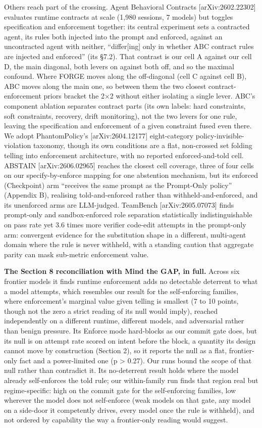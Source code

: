 \documentclass[11pt]{article}
\begin{document}
Others reach part of the crossing. Agent Behavioral Contracts {[}arXiv:2602.22302{]} evaluates runtime contracts at scale (1,980 sessions, 7 models) but toggles specification and enforcement together: its central experiment sets a contracted agent, its rules both injected into the prompt and enforced, against an uncontracted agent with neither, ``differ{[}ing{]} only in whether ABC contract rules are injected and enforced'' (its \S7.2). That contrast is our cell A against our cell D, the main diagonal, both levers on against both off, and so the maximal confound. Where FORGE moves along the off-diagonal (cell C against cell B), ABC moves along the main one, so between them the two closest contract-enforcement priors bracket the 2$\times$2 without either isolating a single lever. ABC's component ablation separates contract parts (its own labels: hard constraints, soft constraints, recovery, drift monitoring), not the two levers for one rule, leaving the specification and enforcement of a given constraint fused even there. We adopt PhantomPolicy's {[}arXiv:2604.12177{]} eight-category policy-invisible-violation taxonomy, though its own conditions are a flat, non-crossed set folding telling into enforcement architecture, with no reported enforced-and-told cell. ABSTAIN {[}arXiv:2606.02965{]} reaches the closest cell coverage, three of four cells on our specify-by-enforce mapping for one abstention mechanism, but its enforced (Checkpoint) arm ``receives the same prompt as the Prompt-Only policy'' (Appendix B), realising told-and-enforced rather than withheld-and-enforced, and its unenforced arms are LLM-judged. TeamBench {[}arXiv:2605.07073{]} finds prompt-only and sandbox-enforced role separation statistically indistinguishable on pass rate yet 3.6 times more verifier code-edit attempts in the prompt-only arm: convergent evidence for the substitution shape in a different, multi-agent domain where the rule is never withheld, with a standing caution that aggregate parity can mask sub-metric enforcement value.

\textbf{The Section 8 reconciliation with Mind the GAP, in full.} Across six frontier models it finds runtime enforcement adds no detectable deterrent to what a model attempts, which resembles our result for the self-enforcing families, where enforcement's marginal value given telling is smallest (7 to 10 points, though not the zero a strict reading of its null would imply), reached independently on a different runtime, different models, and adversarial rather than benign pressure. Its Enforce mode hard-blocks as our commit gate does, but its null is on attempt rate scored on intent before the block, a quantity its design cannot move by construction (Section 2), so it reports the null as a flat, frontier-only fact and a power-limited one (p \textgreater{} 0.27). Our runs bound the scope of that null rather than contradict it. Its no-deterrent result holds where the model already self-enforces the told rule; our within-family run finds that region real but regime-specific: high on the commit gate for the self-enforcing families, low wherever the model does not self-enforce (weak models on that gate, any model on a side-door it competently drives, every model once the rule is withheld), and not ordered by capability the way a frontier-only reading would suggest.
\end{document}
